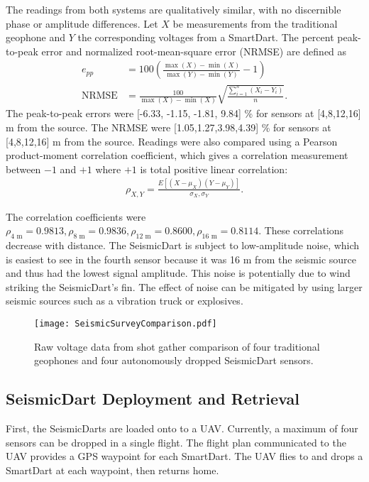 The readings from both systems are qualitatively similar, with no discernible phase or amplitude differences. Let $X$ be measurements from the traditional geophone and $Y$ the corresponding voltages from a SmartDart.
The percent peak-to-peak error and normalized root-mean-square error (NRMSE) are defined as
\begin{align}
e_{pp} &= 100 \left( \frac{ \max(X) - \min(X) }{ \max(Y) - \min(Y) } -1\right) \\
  \text{NRMSE} &=\frac{100}{\max(X) - \min(X)} \sqrt{ \frac{ \sum_{i=1}^n \left( X_i - Y_i \right)}{n} }.
\end{align}
The peak-to-peak errors were [-6.33, -1.15, -1.81,  9.84] \% for sensors at [4,8,12,16] m from the source.
 The NRMSE were [1.05,1.27,3.98,4.39] \% for sensors at [4,8,12,16] m from the source.
Readings were also compared using a Pearson product-moment correlation coefficient, which gives a correlation measurement between $-1$ and $+1$ where $+1$ is total positive linear correlation:
\begin{align}
\rho_{X,Y} = \frac{E\left[  (X-\mu_X) (Y-\mu_Y)  \right]}{  \sigma_X, \sigma_Y}.
\end{align}

The correlation coefficients were $\rho_{\text{4 m}}  =  0.9813, \rho_{\text{8 m}}  =  0.9836, \rho_{\text{12 m}}  =  0.8600, \rho_{\text{16 m}}  = 0.8114$. These correlations decrease with distance. The SeismicDart is subject to low-amplitude noise, which is easiest to see in the fourth sensor because it was 16 m from the seismic source and thus had the lowest signal amplitude.  This noise is potentially due to wind striking the SeismicDart's fin. The effect of noise can be mitigated by using larger seismic sources such as a vibration truck or explosives.



\begin{figure} \centering
  {\texttt{[image: SeismicSurveyComparison.pdf]}}
 \caption{Raw voltage data from shot gather comparison of four traditional geophones and four autonomously dropped SeismicDart sensors.  
 \label{fig:shotgather_auto_drop}}
\end{figure}

\subsection{SeismicDart Deployment and Retrieval}
First, the SeismicDarts are loaded onto to a UAV. 
Currently, a maximum of four sensors can be dropped in a single flight. 
The flight plan communicated to the UAV provides a GPS waypoint for each SmartDart. 
The UAV flies to and drops a SmartDart at each waypoint, then returns home. 

